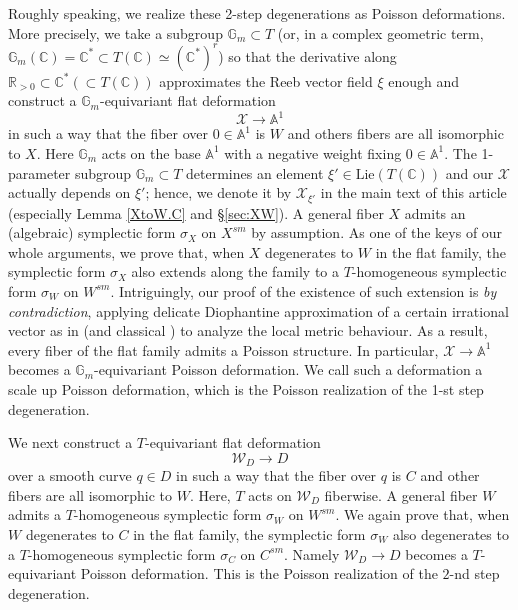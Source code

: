 \documentclass[12pt,a4paper]{amsart}
\theoremstyle{remark}
\theoremstyle{definition}
\def\R{\mathbb{R}}
\def\C{\mathbb{C}}
\def\G{\mathbb{G}}
\begin{document}
Roughly speaking, we realize these 2-step degenerations as Poisson deformations. 
More precisely, we take a subgroup $\mathbb{G}_m \subset T$ 
(or, in a complex geometric term, 
$\G_m(\C)=\C^*\subset T(\C)\simeq (\C^*)^r$) 
so that the derivative along $\R_{>0}\subset \C^*(\subset T(\C))$ 
approximates the Reeb vector field $\xi$ enough and 
construct a $\mathbb{G}_m$-equivariant flat deformation $$\mathcal{X} \to 
\mathbb{A}^1$$ in such a way that the fiber over $0 \in \mathbb{A}^1$ is $W$ 
and others fibers are all isomorphic to $X$. Here $\mathbb{G}_m$ acts on 
the base $\mathbb{A}^1$ with a negative weight fixing $0 \in \mathbb{A}^1$. 
The 1-parameter subgroup $\mathbb{G}_m 
\subset T$ determines an element 
$\xi' \in \mathrm{Lie}(T(\C))$ and 
our $\mathcal{X}$ actually depends on $\xi'$; hence, we denote it by $\mathcal{X}_{\xi'}$ in the main text of this article (especially Lemma \ref{XtoW.C} and \S \ref{sec:XW}). 
A general fiber $X$ admits an (algebraic) symplectic form $\sigma_X$ on  $X^{sm}$ by assumption. As one of the keys of our whole arguments, 
we prove that, when $X$ degenerates to $W$ in the flat family, the symplectic form $\sigma_X$ also extends along the 
family to a $T$-homogeneous symplectic form $\sigma_W$ on $W^{sm}$. 
Intriguingly, our proof of the existence of such extension 
is {\it by contradiction}, applying delicate Diophantine approximation of a 
certain irrational vector as in \cite{Schmid} (and classical \cite{Kronecker, Weyl}) to analyze the local  metric behaviour. 
As a result, every fiber of the flat family admits a Poisson structure. In particular,  $\mathcal{X} \to \mathbb{A}^1$ becomes a $\mathbb{G}_m$-equivariant Poisson deformation. We call such a deformation a scale up Poisson deformation, which is the Poisson realization of the 1-st step  degeneration. 

We next construct a $T$-equivariant flat deformation  $$\mathcal{W}_D \to D$$ over a smooth curve $q \in D$ in such a way 
that the fiber over $q$ is $C$ and other fibers are all isomorphic to $W$. Here, $T$ acts on $\mathcal{W}_D$ fiberwise. 
A general fiber $W$ admits a $T$-homogeneous symplectic form $\sigma_W$ on $W^{sm}$. We again prove that, when $W$ degenerates to 
$C$ in the flat family, the symplectic form $\sigma_W$ also degenerates to a $T$-homogeneous symplectic form $\sigma_C$ on 
$C^{sm}$. Namely $\mathcal{W}_D \to D$ becomes a $T$-equivariant Poisson deformation. This is the Poisson realization of the $2$-nd step  degeneration. 
\end{document}

